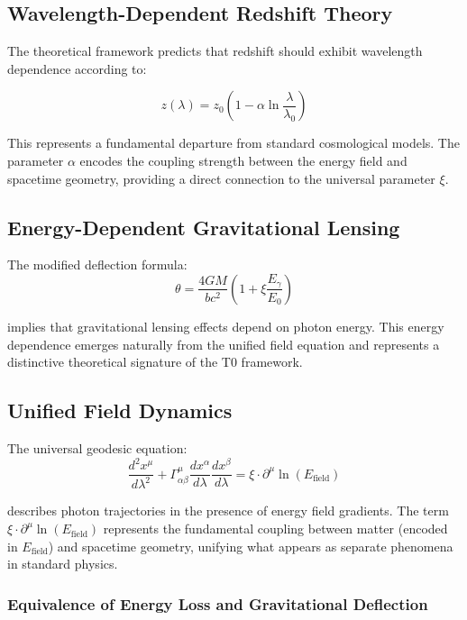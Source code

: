 \documentclass[12pt,a4paper]{article}
\newcommand{\efield}{E_{\text{field}}}
\theoremstyle{definition}
\begin{document}
	\subsection{Wavelength-Dependent Redshift Theory}

The theoretical framework predicts that redshift should exhibit wavelength dependence according to:

\begin{equation}
	z(\lambda) = z_0\left(1 - \alpha \ln\frac{\lambda}{\lambda_0}\right)
\end{equation}

This represents a fundamental departure from standard cosmological models. The parameter $\alpha$ encodes the coupling strength between the energy field and spacetime geometry, providing a direct connection to the universal parameter $\xi$.

	\subsection{Energy-Dependent Gravitational Lensing}
	
	The modified deflection formula:
	\begin{equation}
		\theta = \frac{4GM}{bc^2}\left(1 + \xi \frac{E_\gamma}{E_0}\right)
	\end{equation}
	
	implies that gravitational lensing effects depend on photon energy. This energy dependence emerges naturally from the unified field equation and represents a distinctive theoretical signature of the T0 framework.
	
	\subsection{Unified Field Dynamics}
	
	The universal geodesic equation:
	\begin{equation}
		\frac{d^2 x^\mu}{d\lambda^2} + \Gamma^\mu_{\alpha\beta}\frac{dx^\alpha}{d\lambda}\frac{dx^\beta}{d\lambda} = \xi \cdot \partial^\mu \ln(\efield)
	\end{equation}
	
	describes photon trajectories in the presence of energy field gradients. The term $\xi \cdot \partial^\mu \ln(\efield)$ represents the fundamental coupling between matter (encoded in $\efield$) and spacetime geometry, unifying what appears as separate phenomena in standard physics.
	
	\subsubsection{Equivalence of Energy Loss and Gravitational Deflection}
	
\end{document}
